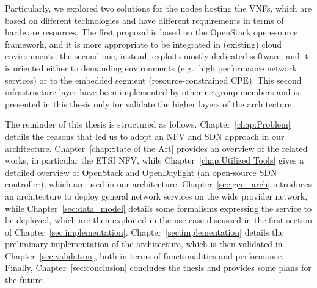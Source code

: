 Particularly, we explored two solutions for the nodes hosting the VNFs, which are based on different technologies and have different requirements in terms of hardware resources.
The first proposal is based on the OpenStack open-source framework, and it is more appropriate to be integrated in (existing) cloud environments; the second one, instead, exploits mostly dedicated software, and it is oriented either to demanding environments (e.g., high performance network services) or to the embedded segment (resource-constrained CPE). This second infrastructure layer have been implemented by other netgroup members and is presented in this thesis only for validate the higher layers of the architecture. 

The reminder of this thesis is structured as follows. 
Chapter~\ref{chap:Problem} details the reasons that led us to adopt an NFV and SDN approach in our architecture.
Chapter~\ref{chap:State of the Art} provides an overview of the related works, in particular the ETSI NFV, while Chapter~\ref{chap:Utilized Tools} gives a detailed overview of OpenStack  and OpenDaylight (an open-source SDN controller), which are used in our architecture. Chapter~\ref{sec:gen_arch} introduces an architecture to deploy general network services on the wide provider network, while Chapter~\ref{sec:data_model} details some formalisms expressing the service to be deployed, which are then exploited in the use case discussed in the first section of Chapter~\ref{sec:implementation}.
Chapter~\ref{sec:implementation} details the preliminary implementation of the architecture, which is then validated in Chapter~\ref{sec:validation}, both in terms of functionalities and performance.
Finally, Chapter~\ref{sec:conclusion} concludes the thesis and provides some plans for the future.